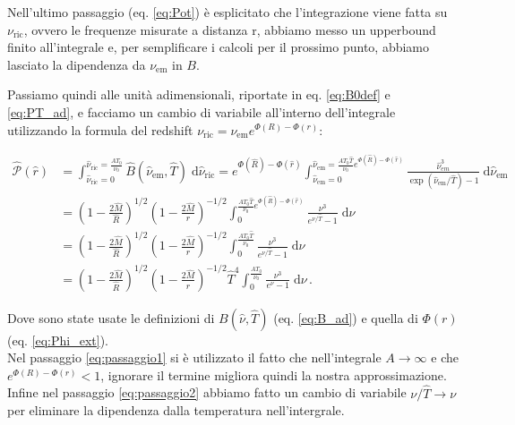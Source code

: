 \documentclass[a4paper, titlepage]{article}
\begin{document}
Nell'ultimo passaggio (eq. \ref{eq:Pot}) è esplicitato che l'integrazione viene
fatta su $\nu_\text{ric}$, ovvero le frequenze misurate a distanza r, abbiamo
messo un upperbound finito all'integrale e, per semplificare i calcoli per il
prossimo punto, abbiamo lasciato la dipendenza da $\nu_\text{em}$ in $B$.

Passiamo quindi alle unità adimensionali, riportate in eq. \ref{eq:B0def} e \ref{eq:PT_ad}, e
facciamo un cambio di variabile all'interno dell'integrale utilizzando la
formula del redshift $\nu_\text{ric} = \nu_\text{em} e^{\Phi(R) - \Phi(r)}$:

\begin{subequations}
\begin{align}
    \hat{\mathcal P}(\hat r)
    &= \int_{\hat \nu_\text{ric} = 0}^{\hat \nu_\text{ric} = \frac{A T_0}{\nu_0}}
    \hat B (\hat \nu_\text{em}, \hat T) \; \mathrm{d} \hat \nu_\text{ric}
    = e^{\Phi(\hat R) - \Phi(\hat r)}
    \int_{\hat \nu_\text{em} = 0}^{\hat \nu_\text{em} = \frac{A T_0 \hat T}{\nu_0} e^{\Phi(\hat R) - \Phi(\hat r)}}
    \frac{\hat \nu_{em}^3}{\exp(\hat \nu_\text{em} / \hat T) - 1} \; \mathrm{d}\hat \nu_\text{em} \\
    &= \left(1 - \frac{2 \hat M}{\hat R} \right)^{1/2}
    \left(1 - \frac{2 \hat M}{\hat r} \right)^{-1/2}
    \int_0^{\frac{A T_0 \hat T}{\nu_0} e^{\Phi(\hat R) - \Phi(\hat r)}}
    \frac{\nu^3}{e^{\nu / \hat T} - 1} \; \mathrm{d} \nu \\
    &= \left(1 - \frac{2 \hat M}{\hat R} \right)^{1/2}
    \left(1 - \frac{2 \hat M}{\hat r} \right)^{-1/2}
    \int_0^{\frac{A T_0 \hat T}{\nu_0}} \frac{\nu^3}{e^{\nu / \hat T} - 1} \;
    \mathrm{d} \nu \label{eq:passaggio1} \\
    &= \left(1 - \frac{2 \hat M}{\hat R} \right)^{1/2}
    \left(1 - \frac{2 \hat M}{\hat r} \right)^{-1/2} \hat T^4
    \int_0^{\frac{A T_0}{\nu_0}} \frac{\nu^3}{e^{\nu} - 1} \;
    \mathrm{d} \nu \, . \label{eq:passaggio2}
\end{align}
\label{eq:Pot_ad}
\end{subequations}

Dove sono state usate le definizioni di $B(\hat \nu, \hat T)$ (eq.
\ref{eq:B_ad}) e quella di $\Phi (r)$ (eq. \ref{eq:Phi_ext}). \\
Nel passaggio \ref{eq:passaggio1} si è utilizzato il fatto che nell'integrale
$A \to \infty$ e che $e^{\Phi(R) - \Phi(r)} < 1$, ignorare il termine migliora
quindi la nostra approssimazione. \\
Infine nel passaggio \ref{eq:passaggio2} abbiamo fatto un cambio di variabile
$\nu / \hat T \rightarrow \nu$ per eliminare la dipendenza dalla temperatura
nell'intergrale.
\end{document}
